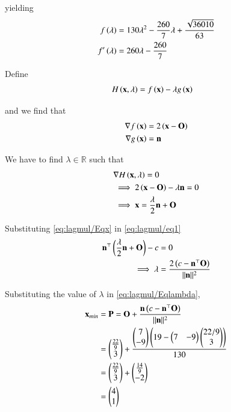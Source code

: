 \documentclass[journal,12pt,twocolumn]{IEEEtran}
\renewcommand{\vec}[1]{\boldsymbol{\mathbf{#1}}}
\begin{document}
yielding
\begin{align}
    f\left(\lambda\right) &= 130\lambda^2 -\frac{260}{7}\lambda + \frac{\sqrt{36010}}{63}\\
    f^\prime\left(\lambda\right) &= 260\lambda -\frac{260}{7}
\end{align}

Define
\begin{align}
	H\brak{\vec{x}, \lambda} &= f\brak{\vec{x}} - \lambda g\brak{\vec{x}} 
\end{align}

and we find that 
\begin{align}
	\nabla f\brak{\vec{x}} &= 2\brak{\vec{x}-\vec{O}} \\
        \nabla g\brak{\vec{x}} &= \vec{n}
\end{align}

We have to find $\lambda \in \mathbb{R}$ such that
\begin{align}
	&\nabla H\brak{\vec{x},\lambda} = 0 \\
        \label{eq:lagmul/Eqlambda}
	&\implies 2\brak{\vec{x}-\vec{O}} - \lambda\vec{n} = 0 \\
        \label{eq:lagmul/Eqx}
	&\implies \vec{x} = \frac{\lambda}{2}\vec{n} + \vec{O} 
\end{align}

Substituting \eqref{eq:lagmul/Eqx} in \eqref{eq:lagmul/eq1}
\begin{align}
	\vec{n}^\top\brak{\frac{\lambda}{2}\vec{n} + \vec{O}}-c &= 0 \\
	\implies \lambda &= \frac{2\brak{c-\vec{n}^\top\vec{O}}}{\norm{\vec{n}}^2}
\end{align}

Substituting the value of $\lambda$ in \eqref{eq:lagmul/Eqlambda}, 
\begin{align}
	\vec{x}_{min} &= \vec{P} = \vec{O}+ \frac{\vec{n}\brak{c-\vec{n}^\top\vec{O}}}{\norm{\vec{n}}^2}\\
	&= \myvec{\frac{22}{9} \\ 3}+ \frac{\myvec{7 \\ -9}\brak{19 -\myvec{7 & -9}\myvec{22/9 \\ 3}}}{130} \\
    &= \myvec{\frac{22}{9} \\ 3}+  \myvec{\frac{14}{9} \\ -2} \\
	&= \myvec{4 \\ 1}
\end{align}	
\end{document}
